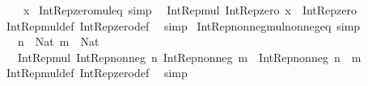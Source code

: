 \begin{isabellebody}
\ \ \ \ x{\isachardoublequoteclose}\isanewline
\isanewline
{}\isamarkupfalse%
\ Int{\isacharunderscore}{\kern0pt}Rep{\isacharunderscore}{\kern0pt}zero{\isacharunderscore}{\kern0pt}mul{\isacharunderscore}{\kern0pt}eq\ {\isacharbrackleft}{\kern0pt}simp{\isacharbrackright}{\kern0pt}{\isacharcolon}{\kern0pt}\isanewline
\ \ {\isachardoublequoteopen}Int{\isacharunderscore}{\kern0pt}Rep{\isacharunderscore}{\kern0pt}mul\ Int{\isacharunderscore}{\kern0pt}Rep{\isacharunderscore}{\kern0pt}zero\ x\ {\isacharequal}{\kern0pt}\ Int{\isacharunderscore}{\kern0pt}Rep{\isacharunderscore}{\kern0pt}zero{\isachardoublequoteclose}\isanewline
%
\isadelimproof
\ \ %
\endisadelimproof
%
\isatagproof
{}\isamarkupfalse%
\ Int{\isacharunderscore}{\kern0pt}Rep{\isacharunderscore}{\kern0pt}mul{\isacharunderscore}{\kern0pt}def\ Int{\isacharunderscore}{\kern0pt}Rep{\isacharunderscore}{\kern0pt}zero{\isacharunderscore}{\kern0pt}def\ \isamarkupfalse%
\ simp%
\endisatagproof
{\isafoldproof}%
%
\isadelimproof
\isanewline
%
\endisadelimproof
\isanewline
{}\isamarkupfalse%
\ Int{\isacharunderscore}{\kern0pt}Rep{\isacharunderscore}{\kern0pt}nonneg{\isacharunderscore}{\kern0pt}mul{\isacharunderscore}{\kern0pt}nonneg{\isacharunderscore}{\kern0pt}eq\ {\isacharbrackleft}{\kern0pt}simp{\isacharbrackright}{\kern0pt}{\isacharcolon}{\kern0pt}\isanewline
\ \ \ {\isachardoublequoteopen}n\ {\isacharcolon}{\kern0pt}\ Nat{\isachardoublequoteclose}\ {\isachardoublequoteopen}m\ {\isacharcolon}{\kern0pt}\ Nat{\isachardoublequoteclose}\isanewline
\ \ \ {\isachardoublequoteopen}Int{\isacharunderscore}{\kern0pt}Rep{\isacharunderscore}{\kern0pt}mul\ {\isacharparenleft}{\kern0pt}Int{\isacharunderscore}{\kern0pt}Rep{\isacharunderscore}{\kern0pt}nonneg\ n{\isacharparenright}{\kern0pt}\ {\isacharparenleft}{\kern0pt}Int{\isacharunderscore}{\kern0pt}Rep{\isacharunderscore}{\kern0pt}nonneg\ m{\isacharparenright}{\kern0pt}\ {\isacharequal}{\kern0pt}\ Int{\isacharunderscore}{\kern0pt}Rep{\isacharunderscore}{\kern0pt}nonneg\ {\isacharparenleft}{\kern0pt}n\ {\isacharasterisk}{\kern0pt}\ m{\isacharparenright}{\kern0pt}{\isachardoublequoteclose}\isanewline
%
\isadelimproof
\ \ %
\endisadelimproof
%
\isatagproof
{}\isamarkupfalse%
\ Int{\isacharunderscore}{\kern0pt}Rep{\isacharunderscore}{\kern0pt}mul{\isacharunderscore}{\kern0pt}def\ Int{\isacharunderscore}{\kern0pt}Rep{\isacharunderscore}{\kern0pt}zero{\isacharunderscore}{\kern0pt}def\ \isamarkupfalse%
\ simp%
\endisatagproof
{\isafoldproof}%

\end{isabellebody}
